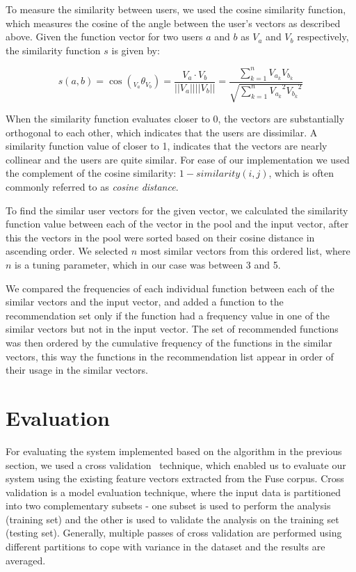 \documentclass[conference]{IEEEtran}
\begin{document}
To measure the similarity between users, we used the cosine similarity function, which measures the cosine of the angle between the user's vectors as described above. Given the function vector for two users $a$ and $b$ as $V_a$ and $V_b$ respectively, the similarity function $s$ is given by:

\begin{center}
	\[
	s(a, b) = \cos({}_{V_a}\theta_{V_b}) = \frac{V_a \cdot V_b}{||V_a|| ||V_b||} = \frac{\sum\limits_{k=1}^{n} V_{a_k}V_{b_k}}{\sqrt{\sum\limits_{k=1}^{n} {V_{a_k}}^2  {V_{b_k}}^2}}
	\]
\end{center}

When the similarity function evaluates closer to 0, the vectors are substantially orthogonal to each other, which indicates that the users are dissimilar. A similarity function value of closer to 1, indicates that the vectors are nearly collinear and the users are quite similar. For ease of our implementation we used the complement of the cosine similarity: $1 - similarity(i,j)$, which is often commonly referred to as \textit{cosine distance}.

To find the similar user vectors for the given vector, we calculated the similarity function value between each of the vector in the pool and the input vector, after this the vectors in the pool were sorted based on their cosine distance in ascending order. We selected $n$ most similar vectors from this ordered list, where $n$ is a tuning parameter, which in our case was between 3 and 5.

We compared the frequencies of each individual function between each of the similar vectors and the input vector, and added a function to the recommendation set only if the function had a frequency value in one of the similar vectors but not in the input vector. The set of recommended functions was then ordered by the cumulative frequency of the functions in the similar vectors, this way the functions in the recommendation list appear in order of their usage in the similar vectors.

\section{Evaluation}
For evaluating the system implemented based on the algorithm in the previous section, we used a cross validation~\cite{Kohavi95astudy} technique, which enabled us to evaluate our system using the existing feature vectors extracted from the Fuse corpus. Cross validation is a model evaluation technique, where the input data is partitioned into two complementary subsets - one subset is used to perform the analysis (training set) and the other is used to validate the analysis on the training set (testing set). Generally, multiple passes of cross validation are performed using different partitions  to cope with variance in the dataset and the results are averaged.
\end{document}
